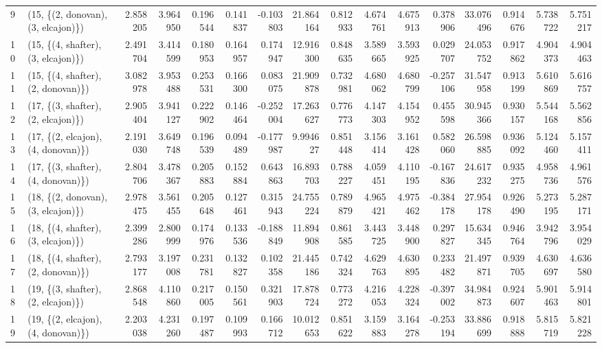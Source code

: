 \begin{tabular}{llrrrrrrrrrrrrrr}
9  &  (15, \{(2, donovan), (3, elcajon)\}) &  2.858205 &  3.964950 &   0.196544 &  0.141837 & -0.103803 &  21.864164 &  0.812933 &   4.674761 &  4.675913 &  0.378906 &  33.076496 &  0.914676 &  5.738722 &  5.751217 \\
10 &  (15, \{(4, shafter), (3, elcajon)\}) &  2.491704 &  3.414599 &   0.180953 &  0.164957 &  0.174947 &  12.916300 &  0.848635 &   3.589665 &  3.593925 &  0.029707 &  24.053752 &  0.917862 &  4.904373 &  4.904463 \\
11 &  (15, \{(4, shafter), (2, donovan)\}) &  3.082978 &  3.953488 &   0.253531 &  0.166300 &  0.083075 &  21.909878 &  0.732981 &   4.680062 &  4.680799 & -0.257106 &  31.547958 &  0.913199 &  5.610869 &  5.616757 \\
12 &  (17, \{(3, shafter), (2, elcajon)\}) &  2.905404 &  3.941127 &   0.222902 &  0.146464 & -0.252004 &  17.263627 &  0.776773 &   4.147303 &  4.154952 &  0.455598 &  30.945366 &  0.930157 &  5.544168 &  5.562856 \\
13 &  (17, \{(2, elcajon), (4, donovan)\}) &  2.191030 &  3.649748 &   0.196539 &  0.094489 & -0.177987 &   9.994627 &  0.851448 &   3.156414 &  3.161428 &  0.582060 &  26.598885 &  0.936092 &  5.124460 &  5.157411 \\
14 &  (17, \{(3, shafter), (4, donovan)\}) &  2.804706 &  3.478367 &   0.205883 &  0.152884 &  0.643863 &  16.893703 &  0.788227 &   4.059451 &  4.110195 & -0.167836 &  24.617232 &  0.935275 &  4.958736 &  4.961576 \\
15 &  (18, \{(2, donovan), (3, elcajon)\}) &  2.978475 &  3.561455 &   0.205648 &  0.127461 &  0.315943 &  24.755224 &  0.789879 &   4.965421 &  4.975462 & -0.384178 &  27.954178 &  0.926490 &  5.273195 &  5.287171 \\
16 &  (18, \{(4, shafter), (3, elcajon)\}) &  2.399286 &  2.800999 &   0.174976 &  0.133536 & -0.188849 &  11.894908 &  0.861585 &   3.443725 &  3.448900 &  0.297827 &  15.634345 &  0.946764 &  3.942796 &  3.954029 \\
17 &  (18, \{(4, shafter), (2, donovan)\}) &  2.793177 &  3.197008 &   0.231781 &  0.132827 &  0.102358 &  21.445186 &  0.742324 &   4.629763 &  4.630895 &  0.233482 &  21.497871 &  0.939705 &  4.630697 &  4.636580 \\
18 &  (19, \{(3, shafter), (2, elcajon)\}) &  2.868548 &  4.110860 &   0.217005 &  0.150561 &  0.321903 &  17.878724 &  0.773272 &   4.216053 &  4.228324 & -0.397002 &  34.984873 &  0.924607 &  5.901463 &  5.914801 \\
19 &  (19, \{(2, elcajon), (4, donovan)\}) &  2.203038 &  4.231260 &   0.197487 &  0.109993 &  0.166712 &  10.012653 &  0.851622 &   3.159883 &  3.164278 & -0.253194 &  33.886699 &  0.918888 &  5.815719 &  5.821228 \\

\end{tabular}
